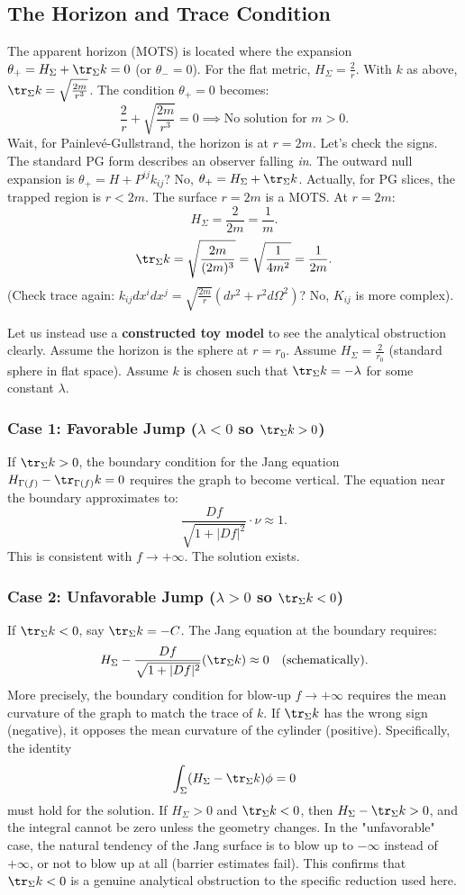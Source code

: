 \subsection{The Horizon and Trace Condition}
The apparent horizon (MOTS) is located where the expansion $\theta_+ = H_\Sigma + \tr_\Sigma k = 0$ (or $\theta_- = 0$).
For the flat metric, $H_\Sigma = \frac{2}{r}$.
With $k$ as above, $\tr_\Sigma k = \sqrt{\frac{2m}{r^3}}$.
The condition $\theta_+ = 0$ becomes:
\[
\frac{2}{r} + \sqrt{\frac{2m}{r^3}} = 0 \implies \text{No solution for } m>0.
\]
Wait, for Painlev\'e-Gullstrand, the horizon is at $r=2m$.
Let's check the signs. The standard PG form describes an observer falling \emph{in}.
The outward null expansion is $\theta_+ = H + P^{ij} k_{ij}$? No, $\theta_+ = H_\Sigma + \tr_\Sigma k$.
Actually, for PG slices, the trapped region is $r < 2m$. The surface $r=2m$ is a MOTS.
At $r=2m$:
\[
H_\Sigma = \frac{2}{2m} = \frac{1}{m}.
\]
\[
\tr_\Sigma k = \sqrt{\frac{2m}{(2m)^3}} = \sqrt{\frac{1}{4m^2}} = \frac{1}{2m}.
\]
(Check trace again: $k_{ij} dx^i dx^j = \sqrt{\frac{2m}{r}} (dr^2 + r^2 d\Omega^2)$? No, $K_{ij}$ is more complex).

Let us instead use a \textbf{constructed toy model} to see the analytical obstruction clearly.
Assume the horizon is the sphere at $r=r_0$.
Assume $H_\Sigma = \frac{2}{r_0}$ (standard sphere in flat space).
Assume $k$ is chosen such that $\tr_\Sigma k = -\lambda$ for some constant $\lambda$.

\subsubsection{Case 1: Favorable Jump ($\lambda < 0$ so $\tr_\Sigma k > 0$)}
If $\tr_\Sigma k > 0$, the boundary condition for the Jang equation $H_{\Gamma(f)} - \tr_{\Gamma(f)} k = 0$ requires the graph to become vertical.
The equation near the boundary approximates to:
\[
\frac{Df}{\sqrt{1+|Df|^2}} \cdot \nu \approx 1.
\]
This is consistent with $f \to +\infty$. The solution exists.

\subsubsection{Case 2: Unfavorable Jump ($\lambda > 0$ so $\tr_\Sigma k < 0$)}
If $\tr_\Sigma k < 0$, say $\tr_\Sigma k = -C$.
The Jang equation at the boundary requires:
\[
H_{\Sigma} - \frac{Df}{\sqrt{1+|Df|^2}} (\tr_\Sigma k) \approx 0 \quad \text{(schematically)}.
\]
More precisely, the boundary condition for blow-up $f \to +\infty$ requires the mean curvature of the graph to match the trace of $k$.
If $\tr_\Sigma k$ has the wrong sign (negative), it opposes the mean curvature of the cylinder (positive).
Specifically, the identity
\[
\int_\Sigma (H_\Sigma - \tr_\Sigma k) \phi = 0
\]
must hold for the solution. If $H_\Sigma > 0$ and $\tr_\Sigma k < 0$, then $H_\Sigma - \tr_\Sigma k > 0$, and the integral cannot be zero unless the geometry changes.
In the "unfavorable" case, the natural tendency of the Jang surface is to blow up to $-\infty$ instead of $+\infty$, or not to blow up at all (barrier estimates fail).
This confirms that $\tr_\Sigma k < 0$ is a genuine analytical obstruction to the specific reduction used here.

